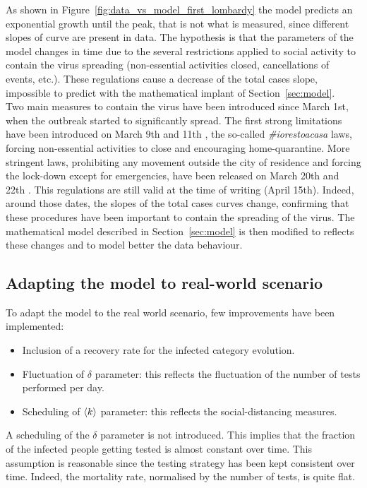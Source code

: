 As shown in Figure~\ref{fig:data_vs_model_first_lombardy} the model predicts an exponential growth until the peak, that is not what is measured, since different slopes of curve are present in data. The hypothesis is that the parameters of the model changes in time due to the several restrictions applied to social activity to contain the virus spreading  (non-essential activities closed, cancellations of events, etc.). These regulations cause a decrease of the total cases slope, impossible to predict with the mathematical implant of Section~\ref{sec:model}. \\

Two main measures to contain the virus have been introduced since March 1st, when the outbreak started to significantly spread. The first strong limitations have been introduced on March 9th \cite{DPCM-0903} and 11th \cite{DPCM-1103}, the so-called \emph{\#iorestoacasa} laws, forcing non-essential activities to close and encouraging home-quarantine. More stringent laws, prohibiting any movement outside the city of residence and forcing the lock-down except for emergencies, have been released on March 20th \cite{DPCM-2003} and 22th \cite{DPCM-2203}. This regulations are still valid at the time of writing (April 15th). Indeed, around those dates, the slopes of the total cases curves change, confirming that these procedures have been important to contain the spreading of the virus. The mathematical model described in Section~\ref{sec:model} is then modified to reflects these changes and to model better the data behaviour.

\subsection{Adapting the model to real-world scenario}
\label{ssec:impr_model}


To adapt the model to the real world scenario, few improvements have been implemented:
\begin{itemize}
\item Inclusion of a recovery rate for the infected category evolution.
\item Fluctuation of $\delta$ parameter: this reflects the fluctuation of the number of tests performed per day.
\item Scheduling of $\braket{k}$ parameter: this reflects the social-distancing measures.
\end{itemize}

A scheduling of the $\delta$ parameter is not introduced. This implies that the fraction of the infected people getting tested is almost constant over time. This assumption is reasonable since the testing strategy has been kept consistent over time. Indeed, the mortality rate, normalised by the number of tests, is quite flat.\\

